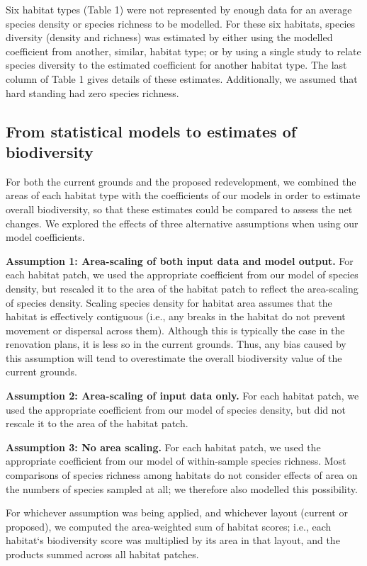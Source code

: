 Six habitat types (Table 1) were not represented by enough data for an average species density or species richness to be modelled. For these six habitats, species diversity (density and richness) was estimated by either using the modelled coefficient from another, similar, habitat type; or by using a single study to relate species diversity to the estimated coefficient for another habitat type.  The last column of Table 1 gives details of these estimates. Additionally, we assumed that hard standing had zero species richness.

\subsection{From statistical models to estimates of biodiversity}
For both the current grounds and the proposed redevelopment, we combined the areas of each habitat type with the coefficients of our models in order to estimate overall biodiversity, so that these estimates could be compared to assess the net changes. We explored the effects of three alternative assumptions when using our model coefficients.

\textbf{Assumption 1: Area-scaling of both input data and model output.} For each habitat patch, we used the appropriate coefficient from our model of species density, but rescaled it to the area of the habitat patch to reflect the area-scaling of species density. Scaling species density for habitat area assumes that the habitat is effectively contiguous (i.e., any breaks in the habitat do not prevent movement or dispersal across them). Although this is typically the case in the renovation plans, it is less so in the current grounds. Thus, any bias caused by this assumption will tend to overestimate the overall biodiversity value of the current grounds.

\textbf{Assumption 2: Area-scaling of input data only.} For each habitat patch, we used the appropriate coefficient from our model of species density, but did not rescale it to the area of the habitat patch. 

\textbf{Assumption 3: No area scaling.} For each habitat patch, we used the appropriate coefficient from our model of within-sample species richness. Most comparisons of species richness among habitats do not consider effects of area on the numbers of species sampled at all; we therefore also modelled this possibility.

For whichever assumption was being applied, and whichever layout (current or proposed), we computed the area-weighted sum of habitat scores; i.e., each habitat`s biodiversity score was multiplied by its area in that layout, and the products summed across all habitat patches.

